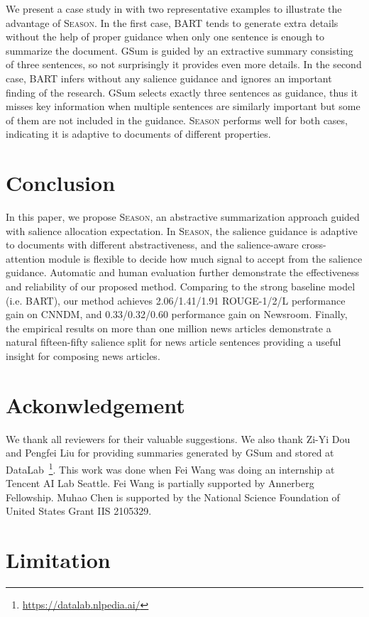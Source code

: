 \documentclass[11pt]{article}
\newcommand{\MODEL}{\mbox{\textsc{Season}}\xspace}
\begin{document}
We present a case study in  with two representative examples to illustrate the advantage of \MODEL. 
In the first case, 
BART tends to generate extra details without the help of proper guidance when only one sentence is enough to summarize the document. 
GSum is guided by an extractive summary consisting of three sentences, so not surprisingly it provides even more details. 
In the second case, 
BART infers without any salience guidance and ignores an important finding of the research. GSum selects exactly three sentences as guidance, thus it misses key information when multiple sentences are similarly important but some of them are not included in the guidance.
\MODEL performs well for both cases, indicating it is adaptive to documents of different properties.

 \section{Conclusion}


In this paper, we propose \MODEL, an abstractive summarization approach guided with salience allocation expectation. In \MODEL, the salience guidance is adaptive to documents with different abstractiveness, and the salience-aware cross-attention module is flexible to decide how much signal to accept from the salience guidance.
Automatic and human evaluation further demonstrate the effectiveness and reliability of our proposed method.
Comparing to the strong baseline model (i.e. BART), our method achieves 2.06/1.41/1.91 ROUGE-1/2/L performance gain on CNNDM, and 0.33/0.32/0.60 performance gain on Newsroom.
Finally, the empirical results on more than one million news articles demonstrate a natural fifteen-fifty salience split for news article sentences providing a useful insight for composing news articles.
 \section*{Ackonwledgement}
We thank all reviewers for their valuable suggestions.
We also thank Zi-Yi Dou and Pengfei Liu for providing summaries generated by GSum and stored at DataLab~\cite{xiao-etal-2022-datalab}\footnote{\url{https://datalab.nlpedia.ai/}}.
This work was done when Fei Wang was doing an internship at Tencent AI Lab Seattle.
Fei Wang is partially supported by Annerberg Fellowship.
Muhao Chen is supported by the National Science Foundation of United States Grant IIS 2105329.
 \section*{Limitation}
\end{document}
